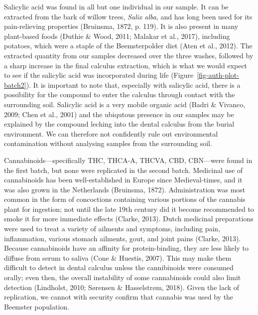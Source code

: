 \documentclass[
]{article}
\begin{document}
Salicylic acid was found in all but one individual in our sample. It can
be extracted from the bark of willow trees, \emph{Salix alba}, and has
long been used for its pain-relieving properties (Bruinsma, 1872, p.
119). It is also present in many plant-based foods (Duthie \& Wood,
2011; Malakar et al., 2017), including potatoes, which were a staple of
the Beemsterpolder diet (Aten et al., 2012). The extracted quantity from
our samples decreased over the three washes, followed by a sharp
increase in the final calculus extraction, which is what we would expect
to see if the salicylic acid was incorporated during life
(Figure~\ref{fig-auth-plot-batch2}). It is important to note that,
especially with salicylic acid, there is a possibility for the compound
to enter the calculus through contact with the surrounding soil.
Salicylic acid is a very mobile organic acid (Badri \& Vivanco, 2009;
Chen et al., 2001) and the ubiqutous presence in our samples may be
explained by the compound leching into the dental calculus from the
burial environment. We can therefore not confidently rule out
environmental contamination without analysing samples from the
surrounding soil.

Cannabinoids---specifically THC, THCA-A, THCVA, CBD, CBN---were found in
the first batch, but none were replicated in the second batch. Medicinal
use of cannabinoids has been well-established in Europe since
Medieval-times, and it was also grown in the Netherlands (Bruinsma,
1872). Administration was most common in the form of concoctions
containing various portions of the cannabis plant for ingestion; not
until the late 19th century did it become recommended to smoke it for
more immediate effects (Clarke, 2013). Dutch medicinal preparations were
used to treat a variety of ailments and symptoms, including pain,
inflammation, various stomach ailments, gout, and joint pains (Clarke,
2013). Because cannabinoids have an affinity for protein-binding, they
are less likely to diffuse from serum to saliva (Cone \& Huestis, 2007).
This may make them difficult to detect in dental calculus unless the
cannibinoids were consumed orally; even then, the overall instability of
some cannabinoids could also limit detection (Lindholst, 2010; Sørensen
\& Hasselstrøm, 2018). Given the lack of replication, we cannot with
security confirm that cannabis was used by the Beemster population.
\end{document}
